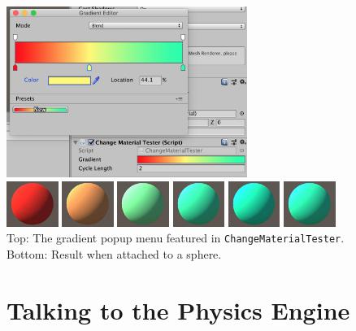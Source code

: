 \documentclass[11pt]{article}
\begin{document}
\begin{center}
\includegraphics[height=15em]{gradient-1}\\
\includegraphics[height=4em]{gradient-display-0}
\includegraphics[height=4em]{gradient-display-1}
\includegraphics[height=4em]{gradient-display-2}
\includegraphics[height=4em]{gradient-display-3}
\includegraphics[height=4em]{gradient-display-4}
\includegraphics[height=4em]{gradient-display-5}\\
Top: The gradient popup menu featured in \lstinline|ChangeMaterialTester|.\\
Bottom: Result when attached to a sphere.
\end{center}

\section{Talking to the Physics Engine}
\end{document}
